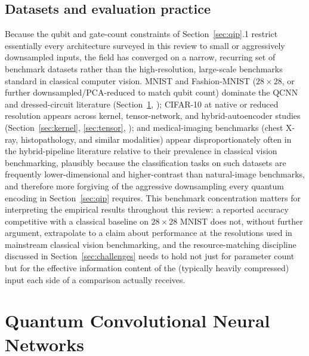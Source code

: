 \documentclass[11pt]{article}
\begin{document}
\subsection{Datasets and evaluation practice}
Because the qubit and gate-count constraints of Section~\ref{sec:qip}.1 restrict essentially every architecture surveyed in this review to small or aggressively downsampled inputs, the field has converged on a narrow, recurring set of benchmark datasets rather than the high-resolution, large-scale benchmarks standard in classical computer vision. MNIST and Fashion-MNIST ($28\times28$, or further downsampled/PCA-reduced to match qubit count) dominate the QCNN and dressed-circuit literature (Section~\ref{sec:qcnn}, \cite{Hur2022,Cong2019,Mari2020}); CIFAR-10 at native or reduced resolution appears across kernel, tensor-network, and hybrid-autoencoder studies (Section~\ref{sec:kernel}, \ref{sec:tensor}, \cite{Slabbert2024,Guala2023}); and medical-imaging benchmarks (chest X-ray, histopathology, and similar modalities) appear disproportionately often in the hybrid-pipeline literature relative to their prevalence in classical vision benchmarking, plausibly because the classification tasks on such datasets are frequently lower-dimensional and higher-contrast than natural-image benchmarks, and therefore more forgiving of the aggressive downsampling every quantum encoding in Section~\ref{sec:qip} requires. This benchmark concentration matters for interpreting the empirical results throughout this review: a reported accuracy competitive with a classical baseline on $28\times28$ MNIST does not, without further argument, extrapolate to a claim about performance at the resolutions used in mainstream classical vision benchmarking, and the resource-matching discipline discussed in Section~\ref{sec:challenges} needs to hold not just for parameter count but for the effective information content of the (typically heavily compressed) input each side of a comparison actually receives.

\section{Quantum Convolutional Neural Networks}
\label{sec:qcnn}
\end{document}
